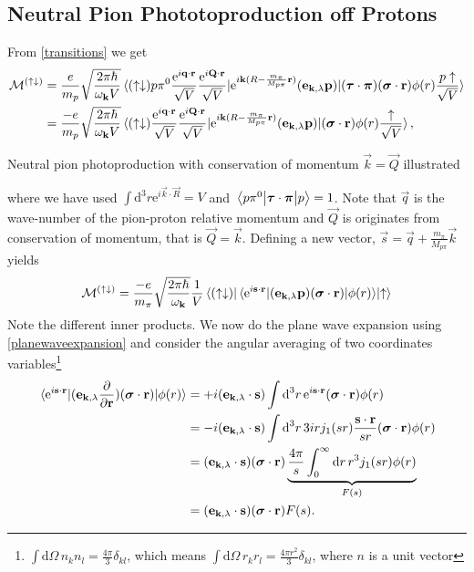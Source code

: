 \subsection{Neutral Pion Phototoproduction off Protons}
From \eqref{transitions} we get
\begin{align}\label{MatrixSpinupdown} 
	\mathcal{M}^{(\uparrow\downarrow)} & = \frac{e}{m_p} \sqrt{\frac{2\pi\hbar}{\omega_{\bm{\mathrm{k}}}V}} \mel*{(\uparrow\downarrow)p\pi^0 \frac{\text{e}^{i\bm{\mathrm{q}}\cdot \bm{\mathrm{r}}}}{\sqrt{V}}\frac{\text{e}^{i\bm{\mathrm{Q}}\cdot \bm{\mathrm{r}}}}{\sqrt{V}}}{\text{e}^{i\bm{\mathrm{k}}(R-\frac{m_\pi}{M_{p\pi}}\bm{\mathrm{r}})}(\bm{\mathrm{e}}_{\bm{\mathrm{k}},\lambda}\bm{\mathrm{p}})}{(\bm{\mathrm{\tau}}\cdot\bm{\mathrm{\pi}})(\bm{\mathrm{\sigma}}\cdot\bm{\mathrm{r}})\phi(r) \frac{p\uparrow}{\sqrt{V}}} \\
	&= \frac{-e}{m_p} \sqrt{\frac{2\pi\hbar}{\omega_{\bm{\mathrm{k}}}V}} \mel*{(\uparrow\downarrow) \frac{\text{e}^{i\bm{\mathrm{q}}\cdot \bm{\mathrm{r}}}}{\sqrt{V}}\frac{\text{e}^{i\bm{\mathrm{Q}}\cdot \bm{\mathrm{r}}}}{\sqrt{V}}}{\text{e}^{i\bm{\mathrm{k}}(R-\frac{m_\pi}{M_{p\pi}}\bm{\mathrm{r}})}(\bm{\mathrm{e}}_{\bm{\mathrm{k}},\lambda}\bm{\mathrm{p}})}{(\bm{\mathrm{\sigma}}\cdot\bm{\mathrm{r}})\phi(r) \frac{\uparrow}{\sqrt{V}}} \label{MatrixSpinupdown2},
\end{align} 
\begin{marginfigure}
	\centering
	
	\caption{Neutral pion photoproduction with conservation of momentum $\vec{k}=\vec{Q}$ illustrated}
	\label{qkenergy}
\end{marginfigure}
where we have used $\int \text{d}^3 r \text{e}^{i\vec{k}\cdot\vec{R}}=V$ and $\mel{p\pi^0}{\bm{\mathrm{\tau}}\cdot\bm{\mathrm{\pi}}}{p}=1$. Note that $\vec{q}$ is the wave-number of the pion-proton relative momentum and $\vec{Q}$ is originates from conservation of momentum, that is $\vec{Q}=\vec{k}$. Defining a new vector, $\vec{s}=\vec{q}+\frac{m_\pi}{M_{p\pi}}\vec{k}$ yields
\begin{equation}
    \mathcal{M}^{(\uparrow\downarrow)} = \frac{-e}{m_\pi} \sqrt{\frac{2\pi\hbar}{\omega_{\bm{\mathrm{k}}}}} \frac{1}{V} \mel*{(\uparrow \downarrow)}{\mel*{\text{e}^{i\bm{\mathrm{s}}\cdot\bm{\mathrm{r}}}}{(\bm{\mathrm{e}}_{\bm{\mathrm{k}},\lambda}\bm{\mathrm{p}})(\bm{\mathrm{\sigma}}\cdot\bm{\mathrm{r}})}{\phi(r)}}{\uparrow}
\end{equation}
Note the different inner products. We now do the plane wave expansion using \eqref{planewaveexpansion} and consider the angular averaging of two coordinates variables\footnote{$\int \text{d}\Omega \, n_k n_l =\frac{4\pi}{3}\delta_{kl}$, which means $\int \text{d}\Omega \, r_k r_l =\frac{4\pi r^2}{3}\delta_{kl}$, where $n$ is a unit vector}
\begin{align}
    \mel*{\text{e}^{i\bm{\mathrm{s}}\cdot\bm{\mathrm{r}}}}{(\bm{\mathrm{e}}_{\bm{\mathrm{k}},\lambda}\frac{\partial}{\partial \bm{\mathrm{r}}})(\bm{\mathrm{\sigma}}\cdot \bm{\mathrm{r}})}{\phi(r)} &=+i(\bm{\mathrm{e}}_{\bm{\mathrm{k}},\lambda}\cdot \bm{\mathrm{s}}) \int \text{d}^3 r \, \text{e}^{i\bm{\mathrm{s}}\cdot\bm{\mathrm{r}}}(\bm{\mathrm{\sigma}}\cdot \bm{\mathrm{r}}) \phi(r) \\ 
    &= -i(\bm{\mathrm{e}}_{\bm{\mathrm{k}},\lambda}\cdot \bm{\mathrm{s}}) \int \text{d}^3 r \, 3 i r j_1(sr) \frac{\bm{\mathrm{s}}\cdot \bm{\mathrm{r}}}{sr}(\bm{\mathrm{\sigma}}\cdot \bm{\mathrm{r}}) \phi(r) \\
    &= (\bm{\mathrm{e}}_{\bm{\mathrm{k}},\lambda}\cdot \bm{\mathrm{s}})(\bm{\mathrm{\sigma}}\cdot \bm{\mathrm{r}}) \underbrace{\frac{4\pi}{s} \int_0^\infty \text{d}r \, r^3 j_1(sr) \phi(r)}_{F(s)}  \\
    &= (\bm{\mathrm{e}}_{\bm{\mathrm{k}},\lambda}\cdot \bm{\mathrm{s}})(\bm{\mathrm{\sigma}}\cdot \bm{\mathrm{r}}) F(s).
\end{align}

